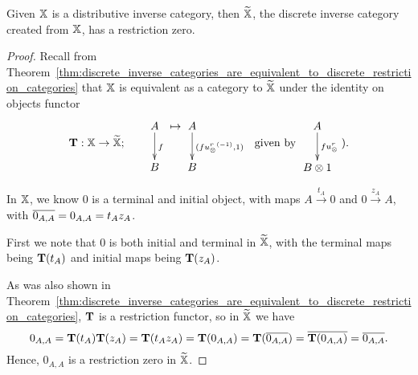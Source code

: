 \begin{lemma}\label{lem:x_tilde_has_a_restriction_zero}
  Given $\mathbb{X}$ is a distributive inverse category, then $\widetilde{\mathbb{X}}$, the discrete inverse category created
  from $\mathbb{X}$, has a restriction zero.
\end{lemma}
\begin{proof}
  Recall from Theorem~\ref{thm:discrete_inverse_categories_are_equivalent_to_discrete_restriction_categories}
  that $\mathbb{X}$ is equivalent as a category to $\widetilde{\mathbb{X}}$ under the identity on objects
  functor
  \[
    {\raisebox{-15pt}{$\wtf:\X \to \Xt;$}} \qquad
    \xymatrix{A\ar[d]^{f}\\B}\mapsto \xymatrix{A\ar[d]^{(f\inv{\usr},1)}\\B}
    \ \raisebox{-15pt}{ given by }\xymatrix{A\ar[d]^{f\usr}\\B\*1}\raisebox{-15pt}{).}
  \]

  In $\mathbb{X}$, we know $0$ is a terminal and initial object, with maps
  $A \xrightarrow{t_A} 0 $ and $0 \xrightarrow{z_A} A$, with $\overline{0_{A,A}} = 0_{A,A} = t_A z_A$.

  First we note that $0$ is both initial and terminal in $\widetilde{\mathbb{X}}$, with the terminal maps being
  $\mathbf{T}(t_A)$ and initial maps being $\mathbf{T}(z_A)$.

  As was also shown in
  Theorem~\ref{thm:discrete_inverse_categories_are_equivalent_to_discrete_restriction_categories},
$\mathbf{T}$ is a restriction functor, so in $\widetilde{\mathbb{X}}$ we have
  \[
    0_{A,A} = \mathbf{T}(t_A)\mathbf{T}(z_A) = \mathbf{T}(t_A z_A) = \mathbf{T}(0_{A,A}) = \mathbf{T}(\overline{0_{A,A}}) =
    \overline{\mathbf{T}(0_{A,A})} = \overline{0_{A,A}}.
  \]
  Hence, $0_{A,A}$ is a restriction zero in $\widetilde{\mathbb{X}}$.
\end{proof}

